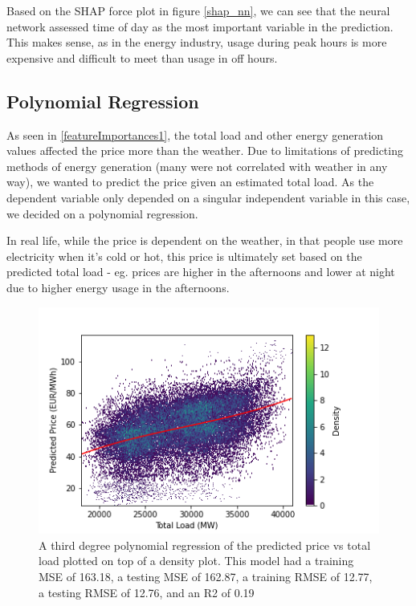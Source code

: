 \documentclass[10pt]{article}
\begin{document}
Based on the SHAP force plot in figure \ref{shap_nn}, we can see that the neural network assessed time of day as the most important variable in the prediction. This makes sense, as in the energy industry, usage during peak hours is more expensive and difficult to meet than usage in off hours.

\subsection{Polynomial Regression}

As seen in \ref{featureImportances1}, the total load and other energy generation values affected the price more than the weather. Due to limitations of predicting methods of energy generation (many were not correlated with weather in any way), we wanted to predict the price given an estimated total load. As the dependent variable only depended on a singular independent variable in this case, we decided on a polynomial regression. 

In real life, while the price is dependent on the weather, in that people use more electricity when it’s cold or hot, this price is ultimately set based on the predicted total load - eg. prices are higher in the afternoons and lower at night due to higher energy usage in the afternoons. 

\begin{figure}[H]
    \centering
    \includegraphics[scale=0.55]{polynomial_regression.png}
    \caption{A third degree polynomial regression of the predicted price vs total load plotted on top of a density plot. This model had a training MSE of 163.18, a testing MSE of 162.87, a training RMSE of 12.77, a testing RMSE of 12.76, and an R2 of 0.19}
    \label{polyreg}
\end{figure}
\end{document}
